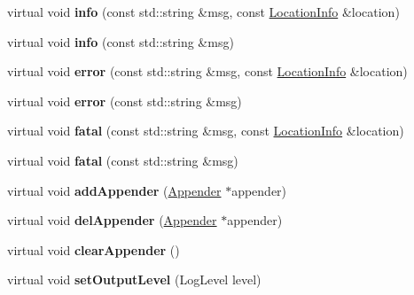 \begin{DoxyCompactItemize}
virtual void {\bfseries info} (const std\+::string \&msg, const \hyperlink{classdaq_1_1LocationInfo}{Location\+Info} \&location)
\item 
\mbox{\label{classdaq_1_1Logger_ae57a4645fb16bd95d4324f5c105643cf}} 
virtual void {\bfseries info} (const std\+::string \&msg)
\item 
\mbox{\label{classdaq_1_1Logger_a580a9e143fe2962ba343f6c369ee8d3b}} 
virtual void {\bfseries error} (const std\+::string \&msg, const \hyperlink{classdaq_1_1LocationInfo}{Location\+Info} \&location)
\item 
\mbox{\label{classdaq_1_1Logger_a9fde9b26f081ab9c5b675b8f5e8b7b01}} 
virtual void {\bfseries error} (const std\+::string \&msg)
\item 
\mbox{\label{classdaq_1_1Logger_a0e7d924e0cbdf5d4d825af3467b8abea}} 
virtual void {\bfseries fatal} (const std\+::string \&msg, const \hyperlink{classdaq_1_1LocationInfo}{Location\+Info} \&location)
\item 
\mbox{\label{classdaq_1_1Logger_a02083da7b56324873c1789caf0aaed25}} 
virtual void {\bfseries fatal} (const std\+::string \&msg)
\item 
\mbox{\label{classdaq_1_1Logger_a01e9511b12a573dcdfde97065faf8d08}} 
virtual void {\bfseries add\+Appender} (\hyperlink{classdaq_1_1Appender}{Appender} $\ast$appender)
\item 
\mbox{\label{classdaq_1_1Logger_aefc5c7cc5ef32470682f6f5d9bf091a0}} 
virtual void {\bfseries del\+Appender} (\hyperlink{classdaq_1_1Appender}{Appender} $\ast$appender)
\item 
\mbox{\label{classdaq_1_1Logger_adc536e834a783094bad34b544d7d6f27}} 
virtual void {\bfseries clear\+Appender} ()
\item 
\mbox{\label{classdaq_1_1Logger_aba27cec75533c4a625453a80d10d8f5b}} 
virtual void {\bfseries set\+Output\+Level} (Log\+Level level)
\item 
\mbox{\label{classdaq_1_1Logger_a25447b37351baad0044153f25919430a}} 

\end{DoxyCompactItemize}
